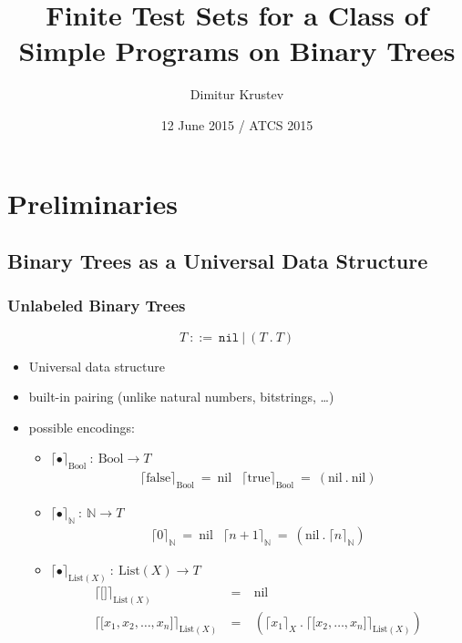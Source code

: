 \documentclass{beamer}
\title{Finite Test Sets for a Class of Simple Programs on Binary Trees}
\author{Dimitur Krustev}
\institute[IGE+XAO Balkan]
{
  IGE+XAO Balkan \\ \vspace{0.3cm} \pgfuseimage{mylogo1}
}
\date[ATCS 2015]{12 June 2015 / ATCS 2015}
\begin{document}
\begin{frame}
\maketitle
\end{frame}

\begin{frame}[Outline]
  \tableofcontents
\end{frame}

\section{Preliminaries}

\subsection{Binary Trees as a Universal Data Structure}

\begin{frame}
  \frametitle{Unlabeled Binary Trees}
	\[ 
	T ~::=~ \texttt{nil} ~|~ (T ~.~ T)
	\]
  \begin{itemize}
    \item Universal data structure 
    \item built-in pairing (unlike natural numbers, bitstrings, \ldots)
    \item possible encodings:
    \begin{itemize}
	  \item $\lceil \bullet \rceil_{\text{Bool}} ~:~ \text{Bool} \rightarrow T$
	  \[
	    \begin{array}{cc}
	    \lceil \text{false} \rceil_{\text{Bool}} ~=~ \text{nil}
	    &
	    \lceil \text{true} \rceil_{\text{Bool}} ~=~ (\text{nil} ~.~ \text{nil})
	    \end{array}
	  \]
	  
	  \item $\lceil \bullet \rceil_{\mathbb{N}} ~:~ \mathbb{N} \rightarrow T$
	  \[
	    \begin{array}{cc}
	    \lceil 0 \rceil_{\mathbb{N}} ~=~ \text{nil}
	    &
	    \lceil n+1 \rceil_{\mathbb{N}} ~=~ (\text{nil} ~.~ \lceil n \rceil_{\mathbb{N}})
	    \end{array}
	  \]
	  
	  \item $\lceil \bullet \rceil_{\text{List}(X)} ~:~ \text{List}(X) \rightarrow T$
	  \[
	    \begin{array}{lcl}
	    \lceil \lbrack\rbrack \rceil_{\text{List}(X)} & ~=~ & \text{nil}
	    \\
	    \lceil \lbrack x_1, x_2, \ldots, x_n \rbrack \rceil_{\text{List}(X)} 
	      & ~=~ & (\lceil x_1 \rceil_{X} ~.~ \lceil \lbrack x_2, \ldots, x_n \rbrack \rceil_{\text{List}(X)})
	    \end{array}
	  \]
    \end{itemize}
  \end{itemize}
\end{frame}
\end{document}
